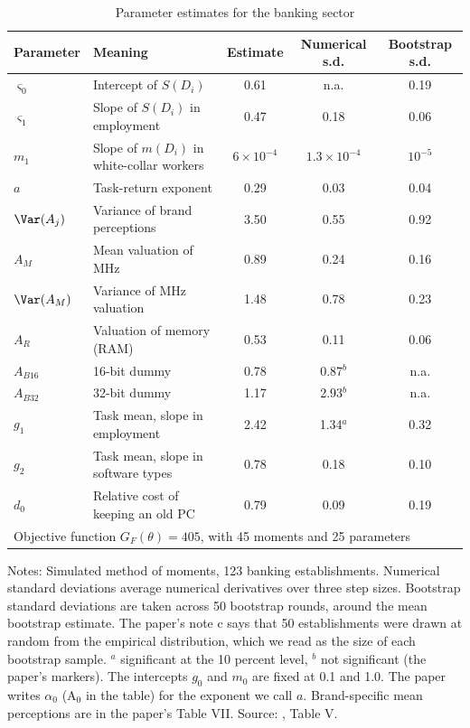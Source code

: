 \begin{table}[htbp]
\centering
\caption{Parameter estimates for the banking sector \citep[Table V]{Hendel1994}}
\label{tab:07-hendel-params}
\small
\begin{tabular}{llccc}
\toprule
Parameter & Meaning & Estimate & Numerical s.d. & Bootstrap s.d. \\
\midrule
$\varsigma_0$ & Intercept of $S(D_i)$ & 0.61 & n.a. & 0.19 \\
$\varsigma_1$ & Slope of $S(D_i)$ in employment & 0.47 & 0.18 & 0.06 \\
$m_1$ & Slope of $m(D_i)$ in white-collar workers & $6\times 10^{-4}$ & $1.3\times 10^{-4}$ & $10^{-5}$ \\
$a$ & Task-return exponent & 0.29 & 0.03 & 0.04 \\
$\Var(A_j)$ & Variance of brand perceptions & 3.50 & 0.55 & 0.92 \\
$A_M$ & Mean valuation of MHz & 0.89 & 0.24 & 0.16 \\
$\Var(A_M)$ & Variance of MHz valuation & 1.48 & 0.78 & 0.23 \\
$A_R$ & Valuation of memory (RAM) & 0.53 & 0.11 & 0.06 \\
$A_{B16}$ & 16-bit dummy & 0.78 & 0.87$^{b}$ & n.a. \\
$A_{B32}$ & 32-bit dummy & 1.17 & 2.93$^{b}$ & n.a. \\
$g_1$ & Task mean, slope in employment & 2.42 & 1.34$^{a}$ & 0.32 \\
$g_2$ & Task mean, slope in software types & 0.78 & 0.18 & 0.10 \\
$d_0$ & Relative cost of keeping an old PC & 0.79 & 0.09 & 0.19 \\
\midrule
\multicolumn{5}{l}{Objective function $G_F(\theta) = 405$, with 45 moments and 25 parameters} \\
\bottomrule
\end{tabular}
\par\medskip
\parbox{\linewidth}{\footnotesize Notes: Simulated method of moments, 123 banking establishments. Numerical
standard deviations average numerical derivatives over three step sizes. Bootstrap standard deviations are taken
across 50 bootstrap rounds, around the mean bootstrap estimate. The paper's note c says that 50 establishments were drawn at random from
the empirical distribution, which we read as the size of each bootstrap sample. $^{a}$ significant at the 10 percent level, $^{b}$ not significant (the paper's markers).
The intercepts $g_0$ and $m_0$ are fixed at 0.1 and 1.0. The paper writes $\alpha_0$ (A$_0$ in the table) for
the exponent we call $a$. Brand-specific mean perceptions are in the paper's Table VII. Source:
\citet{Hendel1994}, Table V.}
\end{table}

